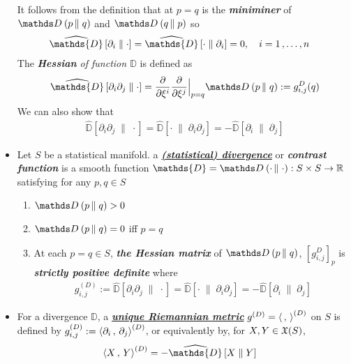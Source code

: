 \documentclass[11pt]{article}
\begin{document}
\begin{itemize}
It follows from the definition that at $p=q$ is the \emph{\textbf{miniminer}} of $\divg{}{p}{q}$ and $\divg{}{q}{p}$ so
\begin{align}
\widehat{\mathds{D}}\left[ \partial_i \;\|\;  \cdot \right] &= \widehat{\mathds{D}}\left[ \cdot  \;\|\; \partial_i  \right] = 0,\quad i=1 \xdotx{,} n \label{eqn: derivation_divergence} 
\end{align}
The \emph{\textbf{Hessian} of function $\mathds{D}$} is defined as 
\begin{align}
\widehat{\mathds{D}}\left[ \partial_i \partial_j \;\|\; \cdot \right] = \partdiff{}{\xi^i}\partdiff{}{\xi^j}\Bigr|_{p=q}\divg{}{p}{q}:= g_{i,j}^{D}(q)  \label{eqn: derivation_divergence_metric} 
\end{align} We can also show that
\begin{align*}
\widehat{\mathds{D}}\left[ \partial_i \partial_j \;\|\; \cdot \right] = \widehat{\mathds{D}}\left[\cdot   \;\|\; \partial_i \partial_j \right] = - \widehat{\mathds{D}}\left[ \partial_i  \;\|\; \partial_j\right] 
\end{align*}


 \item \begin{definition}
Let $S$ be a statistical manifold. a \underline{\emph{\textbf{(statistical) divergence}}} or \emph{\textbf{contrast function}} is a smooth function $\mathds{D} = \divg{}{\cdot}{\cdot}: S \times S  \rightarrow  \bR$ satisfying for any $p,q \in S$
\begin{enumerate}
\item $\divg{}{p}{q} > 0$
\item $\divg{}{p}{q} = 0$ iff $p =q$
\item At each $p=q \in S$, \emph{\textbf{the Hessian matrix}} of $\divg{}{p}{q}$, $[g_{i,j}^{D}]_{p}$ is \emph{\textbf{strictly positive definite}} where
\begin{align*}
g_{i,j}^{(D)} :=  \widehat{\mathds{D}}\left[ \partial_i \partial_j \;\|\; \cdot \right] =  \widehat{\mathds{D}}\left[ \cdot \;\|\; \partial_i \partial_j  \right] = - \widehat{\mathds{D}}\left[  \partial_i  \;\|\;\partial_j  \right] 
\end{align*}
\end{enumerate}
\end{definition}

\item For a divergence $\mathds{D}$, a \underline{\emph{\textbf{unique Riemannian metric}}} $g^{(D)} = \left\langle \,,\,  \right\rangle^{(D)}$ on $S$ is defined by $g_{i,j}^{(D)} := \left\langle \partial_i\,,\, \partial_j \right\rangle^{(D)}$, or equivalently by, for $X, Y \in {\mathfrak X}(S)$,
\begin{align}
\inn{X}{Y}^{(D)} &= -\widehat{\mathds{D}}\left[ X \;\|\;  Y \right]  \label{eqn: inner_product_induced_by_divergence} 
\end{align}


\end{itemize}
\end{document}
